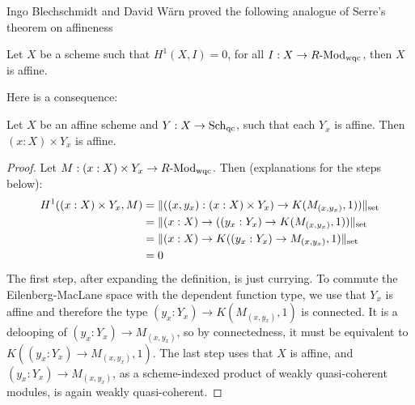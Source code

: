 Ingo Blechschmidt and David Wärn proved the following analogue of
Serre's theorem on affineness

\begin{theorem}
  Let $X$ be a scheme such that $H^1(X,I)=0$,
  for all $I:X\to R\text{-}\mathrm{Mod}_{\mathrm{wqc}}$,
  then $X$ is affine.
\end{theorem}

Here is a consequence:

\begin{corollary}
  Let $X$ be an affine scheme and $Y:X\to \operatorname{\mathrm{Sch}_{qc}}$,
  such that each $Y_x$ is affine.
  Then $(x:X)\times Y_x$ is affine.
\end{corollary}

\begin{proof}
  Let $M:(x:X)\times Y_x\to R\text{-}\mathrm{Mod}_{\mathrm{wqc}}$.
  Then (explanations for the steps below):
  \begin{align*}
    H^1((x:X)\times Y_x,M)&=\lVert ((x,y_x):(x:X)\times Y_x)\to K(M_{(x,y_x)},1)) \rVert_{\mathrm{set}} \\
                          &=\lVert (x:X)\to ((y_x:Y_x)\to K(M_{(x,y_x)},1)) \rVert_{\mathrm{set}} \\
                          &=\lVert (x:X)\to K((y_x:Y_x)\to M_{(x,y_x)},1) \rVert_{\mathrm{set}} \\
                          &=0
  \end{align*}
  The first step, after expanding the definition,
  is just currying.
  To commute the Eilenberg-MacLane space with the dependent function type,
  we use that $Y_x$ is affine and therefore the type $(y_x:Y_x)\to K(M_{(x,y_x)},1)$ is connected.
  It is a delooping of $(y_x:Y_x)\to M_{(x,y_x)}$, so by connectedness,
  it must be equivalent to $K((y_x:Y_x)\to M_{(x,y_x)},1)$.
  The last step uses that $X$ is affine, and $(y_x:Y_x)\to M_{(x,y_x)}$,
  as a scheme-indexed product of weakly quasi-coherent modules, is again weakly quasi-coherent.
  
\end{proof}